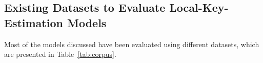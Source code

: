 

\subsection{Existing Datasets to Evaluate Local-Key-Estimation Models}

Most of the models discussed have been evaluated using different datasets, which are presented in Table~\ref{tab:corpus}.

